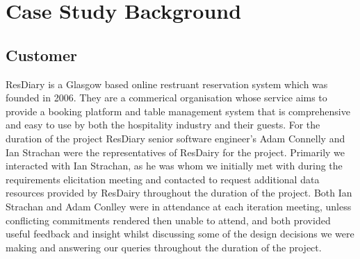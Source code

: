 \documentclass{l3proj}
\begin{document}
\section{Case Study Background}
\label{sec:background}

\subsection{Customer}
\label{customer}


ResDiary is a Glasgow based online restruant reservation system which was founded in 2006. They are a commerical organisation whose service aims to provide a booking platform and table management system that is comprehensive and easy to use by both the hospitality industry and their guests.
For the duration of the project ResDiary senior software engineer's Adam Connelly and Ian Strachan were the representatives of ResDairy for the project.
Primarily we interacted with Ian Strachan, as he was whom we initially met with during the requirements elicitation meeting and contacted to request additional data resources provided by ResDairy throughout the duration of the project.
Both Ian Strachan and Adam Conlley were in attendance at each iteration meeting, unless conflicting commitments rendered then unable to attend, and both provided useful feedback and insight whilst discussing some of the design decisions we were making and answering our queries throughout the duration of the project.
\end{document}
